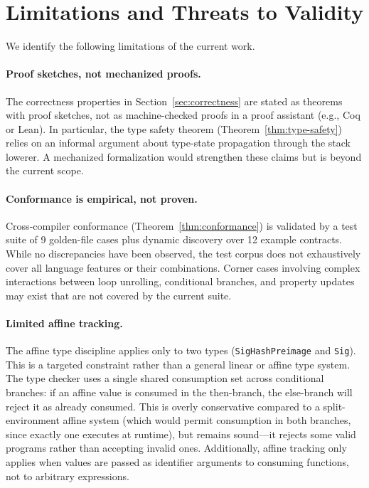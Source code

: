 \documentclass[11pt,a4paper]{article}
\begin{document}
\section{Limitations and Threats to Validity}
\label{sec:limitations}

We identify the following limitations of the current work.

\paragraph{Proof sketches, not mechanized proofs.}
The correctness properties in Section~\ref{sec:correctness} are stated as
theorems with proof sketches, not as machine-checked proofs in a proof
assistant (e.g., Coq or Lean). In particular, the type safety theorem
(Theorem~\ref{thm:type-safety}) relies on an informal argument about
type-state propagation through the stack lowerer. A mechanized
formalization would strengthen these claims but is beyond the current scope.

\paragraph{Conformance is empirical, not proven.}
Cross-compiler conformance (Theorem~\ref{thm:conformance}) is validated
by a test suite of 9 golden-file cases plus dynamic discovery over 12
example contracts. While no discrepancies have been observed, the test
corpus does not exhaustively cover all language features or their
combinations. Corner cases involving complex interactions between loop
unrolling, conditional branches, and property updates may exist that
are not covered by the current suite.

\paragraph{Limited affine tracking.}
The affine type discipline applies only to two types
(\texttt{SigHashPreimage} and \texttt{Sig}). This is a targeted
constraint rather than a general linear or affine type system. The
type checker uses a single shared consumption set across conditional
branches: if an affine value is consumed in the then-branch, the
else-branch will reject it as already consumed. This is overly
conservative compared to a split-environment affine system (which would
permit consumption in both branches, since exactly one executes at
runtime), but remains sound---it rejects some valid programs rather than
accepting invalid ones. Additionally, affine tracking only applies when
values are passed as identifier arguments to consuming functions, not
to arbitrary expressions.
\end{document}
